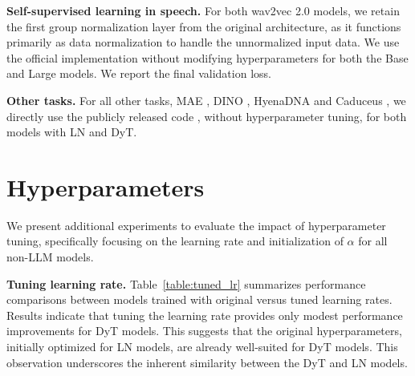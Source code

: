 \documentclass[]{fairmeta}
\renewcommand{\paragraph}[1]{\vspace{1.25mm}\noindent\textbf{#1}}
\begin{document}
\paragraph{Self-supervised learning in speech.} For both wav2vec 2.0 models, we retain the first group normalization layer from the original architecture, as it functions primarily as data normalization to handle the unnormalized input data.
We use the official implementation \citep{wav2vec2} without modifying hyperparameters for both the Base and Large models. We report the final validation loss.

\paragraph{Other tasks.} For all other tasks, MAE \citep{he2022masked}, DINO \citep{caron2021emerging}, HyenaDNA \citep{nguyen2024hyenadna} and Caduceus \citep{schiff2024caduceus}, we directly use the publicly released code \citep{mae, dino, hyena, caduceus}, without hyperparameter tuning, for both models with LN and DyT.


\section{Hyperparameters}
\label{section:tuning}




We present additional experiments to evaluate the impact of hyperparameter tuning, specifically focusing on the learning rate and initialization of $\alpha$ for all non-LLM models. 

\paragraph{Tuning learning rate.} Table~\ref{table:tuned_lr} summarizes performance comparisons between models trained with original versus tuned learning rates. Results indicate that tuning the learning rate provides only modest performance improvements for DyT models. This suggests that the original hyperparameters, initially optimized for LN models, are already well-suited for DyT models. This observation underscores the inherent similarity between the DyT and LN models.
\end{document}
